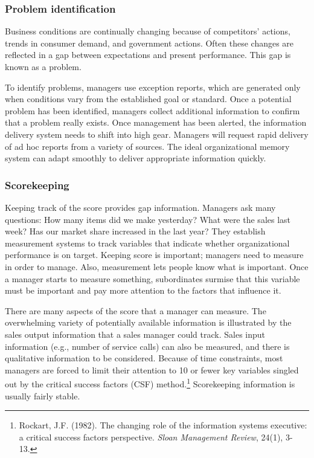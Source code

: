 \documentclass[
]{article}
\begin{document}
\hypertarget{problem-identification}{%
\subsubsection*{Problem identification}\label{problem-identification}}

Business conditions are continually changing because of competitors'
actions, trends in consumer demand, and government actions. Often these
changes are reflected in a gap between expectations and present
performance. This gap is known as a problem.

To identify problems, managers use exception reports, which are
generated only when conditions vary from the established goal or
standard. Once a potential problem has been identified, managers collect
additional information to confirm that a problem really exists. Once
management has been alerted, the information delivery system needs to
shift into high gear. Managers will request rapid delivery of ad hoc
reports from a variety of sources. The ideal organizational memory
system can adapt smoothly to deliver appropriate information quickly.

\hypertarget{scorekeeping}{%
\subsubsection*{Scorekeeping}\label{scorekeeping}}

Keeping track of the score provides gap information. Managers ask many
questions: How many items did we make yesterday? What were the sales
last week? Has our market share increased in the last year? They
establish measurement systems to track variables that indicate whether
organizational performance is on target. Keeping score is important;
managers need to measure in order to manage. Also, measurement lets
people know what is important. Once a manager starts to measure
something, subordinates surmise that this variable must be important and
pay more attention to the factors that influence it.

There are many aspects of the score that a manager can measure. The
overwhelming variety of potentially available information is illustrated
by the sales output information that a sales manager could track. Sales
input information (e.g., number of service calls) can also be measured,
and there is qualitative information to be considered. Because of time
constraints, most managers are forced to limit their attention to 10 or
fewer key variables singled out by the critical success factors (CSF)
method.\footnote{Rockart, J.F. (1982). The changing role of the information systems
  executive: a critical success factors perspective. \emph{Sloan Management
  Review}, 24(1), 3-13.} Scorekeeping information is usually fairly stable.
\end{document}
